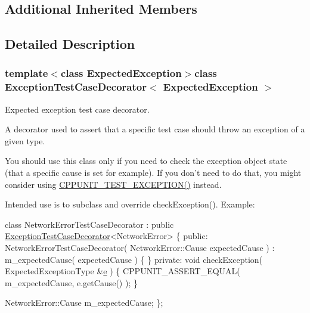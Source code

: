 \subsection*{Additional Inherited Members}


\subsection{Detailed Description}
\subsubsection*{template$<$class Expected\-Exception$>$class Exception\-Test\-Case\-Decorator$<$ Expected\-Exception $>$}

Expected exception test case decorator. 

A decorator used to assert that a specific test case should throw an exception of a given type.

You should use this class only if you need to check the exception object state (that a specific cause is set for example). If you don't need to do that, you might consider using \hyperlink{group___writing_test_fixture_gaca8eeb6f60714baade6cbfd185868c40}{C\-P\-P\-U\-N\-I\-T\-\_\-\-T\-E\-S\-T\-\_\-\-E\-X\-C\-E\-P\-T\-I\-O\-N()} instead.

Intended use is to subclass and override check\-Exception(). Example\-:


\begin{DoxyCode}
\textcolor{keyword}{class }NetworkErrorTestCaseDecorator : 
          \textcolor{keyword}{public} \hyperlink{class_exception_test_case_decorator}{ExceptionTestCaseDecorator}<NetworkError>
\{
\textcolor{keyword}{public}:
  NetworkErrorTestCaseDecorator( NetworkError::Cause expectedCause )
      : m\_expectedCause( expectedCause )
  \{
  \}
\textcolor{keyword}{private}:
  \textcolor{keywordtype}{void} checkException( ExpectedExceptionType &\hyperlink{group__gtc__constants_gab83fb6de0f05d6c0d11bdf0479f8319e}{e} )
  \{
    CPPUNIT\_ASSERT\_EQUAL( m\_expectedCause, e.getCause() );
  \}

  NetworkError::Cause m\_expectedCause;
\};
\end{DoxyCode}
 

